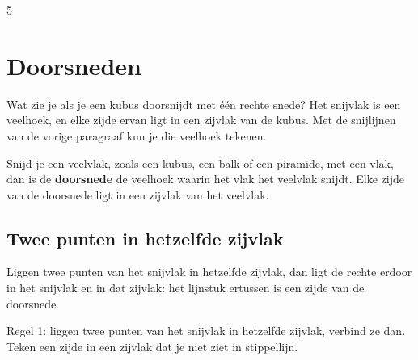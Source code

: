 \begin{alleenvoor}{5}
\section{Doorsneden}

Wat zie je als je een kubus doorsnijdt met één rechte snede? Het snijvlak is een veelhoek, en elke zijde ervan ligt in een zijvlak van de kubus. Met de snijlijnen van de vorige paragraaf kun je die veelhoek tekenen.

\begin{theorie}
Snijd je een veelvlak, zoals een kubus, een balk of een piramide, met een vlak, dan is de \textbf{\textcolor{accent}{doorsnede}} de veelhoek waarin het vlak het veelvlak snijdt. Elke zijde van de doorsnede ligt in een zijvlak van het veelvlak.
\end{theorie}

\subsection{Twee punten in hetzelfde zijvlak}

Liggen twee punten van het snijvlak in hetzelfde zijvlak, dan ligt de rechte erdoor in het snijvlak en in dat zijvlak: het lijnstuk ertussen is een zijde van de doorsnede.


\begin{werkwijze}
Regel 1: liggen twee punten van het snijvlak in hetzelfde zijvlak, verbind ze dan. Teken een zijde in een zijvlak dat je niet ziet in stippellijn.
\end{werkwijze}


\end{alleenvoor}
